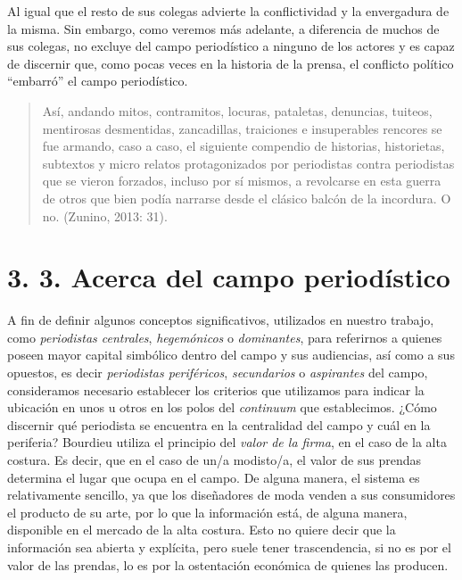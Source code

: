 {Al igual que el resto de sus colegas advierte la conflictividad y la envergadura de la misma. Sin embargo, como veremos más adelante, a diferencia de muchos de sus colegas, no excluye del campo periodístico a ninguno de los actores y es capaz de discernir que, como pocas veces en la historia de la prensa, el conflicto político ``embarró'' el campo periodístico.

\begin{quote}
Así, andando mitos, contramitos, locuras, pataletas, denuncias, tuiteos, mentirosas desmentidas, zancadillas, traiciones e insuperables rencores se fue armando, caso a caso, el siguiente compendio de historias, historietas, subtextos y micro relatos protagonizados por periodistas contra periodistas que se vieron forzados, incluso por sí mismos, a revolcarse en esta guerra de otros que bien podía narrarse desde el clásico balcón de la incordura. O no. (Zunino, 2013: 31).
\end{quote}

\section{3. 3. Acerca del campo periodístico}

A fin de definir algunos conceptos significativos, utilizados en nuestro trabajo, como \emph{periodistas centrales}, \emph{hegemónicos} o \emph{dominantes}, para referirnos a quienes poseen mayor capital simbólico dentro del campo y sus audiencias, así como a sus opuestos, es decir \emph{periodistas periféricos}, \emph{secundarios} o \emph{aspirantes} del campo, consideramos necesario establecer los criterios que utilizamos para indicar la ubicación en unos u otros en los polos del \emph{continuum} que establecimos. ¿Cómo discernir qué periodista se encuentra en la centralidad del campo y cuál en la periferia? Bourdieu utiliza el principio del \emph{valor de la firma}, en el caso de la alta costura. Es decir, que en el caso de un/a modisto/a, el valor de sus prendas determina el lugar que ocupa en el campo. De alguna manera, el sistema es relativamente sencillo, ya que los diseñadores de moda venden a sus consumidores el producto de su arte, por lo que la información está, de alguna manera, disponible en el mercado de la alta costura. Esto no quiere decir que la información sea abierta y explícita, pero suele tener trascendencia, si no es por el valor de las prendas, lo es por la ostentación económica de quienes las producen.

}
